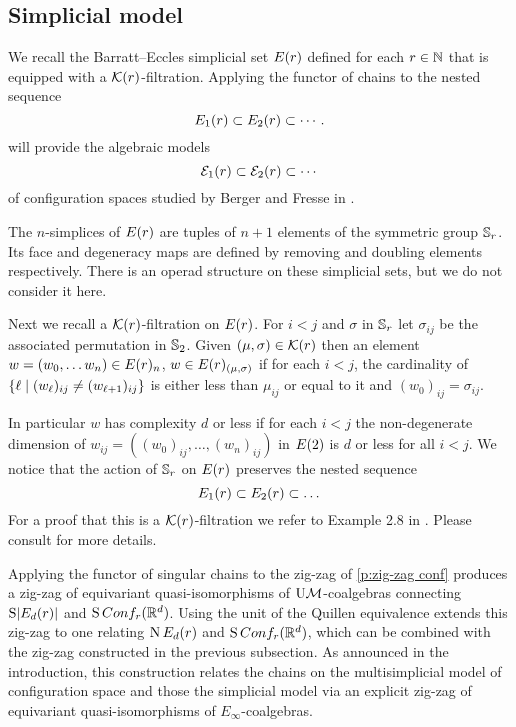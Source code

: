 
\subsection{Simplicial model}\label{ss:simplicial model}

We recall the Barratt--Eccles simplicial set $E(r)$ defined for each $r\in\mathbb{N}$ that is equipped with a $\mathcal{K}(r)$-filtration.
Applying the functor of chains to the nested sequence
\[
E_{1}(r) \subset E_{2}(r) \subset \dotsb.
\]
will provide the algebraic models
\[
\mathcal{E}_{1}(r) \subset \mathcal{E}_{2}(r) \subset \dotsb
\]
of configuration spaces studied by Berger and Fresse in \cite{berger2004combinatorial}.

The $n$-simplices of $E(r)$ are tuples of $n+1$ elements of the symmetric group $\mathbb{S}_r$.
Its face and degeneracy maps are defined by removing and doubling elements respectively.
There is an operad structure on these simplicial sets, but we do not consider it here.

Next we recall a $\mathcal{K}(r)$-filtration on $E(r)$.
For $i<j$ and $\sigma$ in $\mathbb{S}_r$ let $\sigma_{ij}$ be the associated permutation in $\mathbb{S}_2$.
Given $(\mu,\sigma) \in \mathcal{K}(r)$ then an
element $w = (w_0,\dots w_n) \in E(r)_n$,
$w \in E(r)_{(\mu,\sigma)}$ if for each $i<j$, the cardinality of $\{\ell \mid (w_{\ell})_{ij} \neq (w_{\ell+1})_{ij}\}$ is either less than $\mu_{ij}$ or equal to it and $(w_0)_{ij} = \sigma_{ij}$.

In particular $w$ has complexity $d$ or less if for each $i<j$
the non-degenerate dimension of $w_{ij}=((w_0)_{ij},\dots,(w_n)_{ij})$ in $E(2)$ is $d$ or less for all $i<j$.
We notice that the action of $\mathbb{S}_r$ on $E(r)$ preserves the nested sequence
$$E_1(r) \subset E_2(r) \subset \dots$$
For a proof that this is a $\mathcal{K}(r)$-filtration we refer to Example 2.8 in \cite{berger1997confspacemodel}.
Please consult \cite{smith1989filtration,kashiwabara1993confcomplex,berger1997confspacemodel} for more details.
 
Applying the functor of singular chains to the zig-zag of \cref{p:zig-zag conf} produces a zig-zag of equivariant quasi-isomorphisms of $\mathrm{U}\mathcal{M}$-coalgebras connecting $\operatorname{S}\lvert E_d(r)\rvert$ and $\operatorname{S}Conf_{r}(\mathbb{R}^{d})$.
Using the unit of the Quillen equivalence extends this zig-zag to one relating $\operatorname{N}E_d(r)$ and $\operatorname{S}Conf_{r}(\mathbb{R}^{d})$, which can be combined with the zig-zag constructed in the previous subsection.
As announced in the introduction, this construction relates the chains on the multisimplicial model of configuration space and those the simplicial model via an explicit zig-zag of equivariant quasi-isomorphisms of $E_\infty$-coalgebras.

